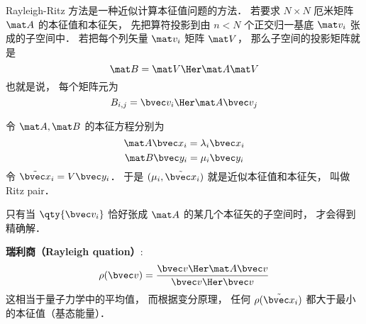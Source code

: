 
\begin{issues}
\issueDraft
\end{issues}


Rayleigh-Ritz 方法是一种近似计算本征值问题的方法． 若要求 $N\times N$ 厄米矩阵 $\mat A$ 的本征值和本征矢， 先把算符投影到由 $n < N$ 个正交归一基底 $\mat v_i$ 张成的子空间中． 若把每个列矢量 $\mat v_i$ 矩阵 $\mat V$， 那么子空间的投影矩阵就是
\begin{equation}
\mat B = \mat V\Her \mat A \mat V
\end{equation}
也就是说， 每个矩阵元为
\begin{equation}
B_{i,j} = \bvec v_i\Her \mat A \bvec v_j
\end{equation}

令 $\mat A, \mat B$ 的本征方程分别为
\begin{equation}
\mat A \bvec x_i = \lambda_i \bvec x_i
\end{equation}
\begin{equation}
\mat B \bvec y_i = \mu_i \bvec y_i
\end{equation}
令 $\tilde{\bvec x}_i = V \bvec y_i$． 于是 $(\mu_i, \tilde{\bvec x}_i)$ 就是近似本征值和本征矢， 叫做 Ritz pair．

只有当 $\qty{\bvec v_i}$ 恰好张成 $\mat A$ 的某几个本征矢的子空间时， 才会得到精确解．

\textbf{瑞利商（Rayleigh quation）}:
\begin{equation}
\rho(\bvec v) = \frac{\bvec v\Her \mat A \bvec v}{\bvec v\Her \bvec v}
\end{equation}
这相当于量子力学中的平均值， 而根据变分原理， 任何 $\rho(\tilde {\bvec x}_i)$ 都大于最小的本征值（基态能量）．
